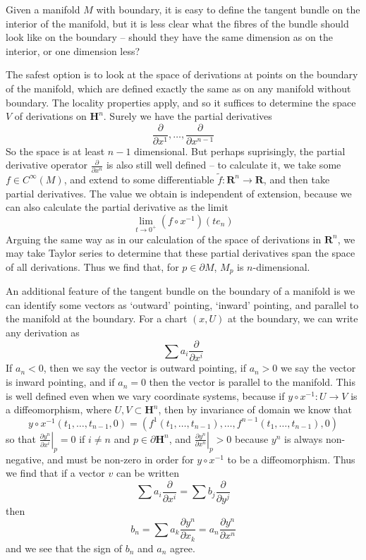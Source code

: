 Given a manifold $M$ with boundary, it is easy to define the tangent bundle on the interior of the manifold, but it is less clear what the fibres of the bundle should look like on the boundary -- should they have the same dimension as on the interior, or one dimension less?

The safest option is to look at the space of derivations at points on the boundary of the manifold, which are defined exactly the same as on any manifold without boundary. The locality properties apply, and so it suffices to determine the space $V$ of derivations on $\mathbf{H}^n$. Surely we have the partial derivatives
%
\[ \frac{\partial}{\partial x^1}, \dots, \frac{\partial}{\partial x^{n-1}} \]
%
So the space is at least $n-1$ dimensional. But perhaps suprisingly, the partial derivative operator $\frac{\partial}{\partial x^n}$ is also still well defined -- to calculate it, we take some $f \in C^\infty(M)$, and extend to some differentiable $\tilde{f}: \mathbf{R}^n \to \mathbf{R}$, and then take partial derivatives. The value we obtain is independent of extension, because we can also calculate the partial derivative as the limit
%
\[ \lim_{t \to 0^+} (f \circ x^{-1})(te_n) \]
%
Arguing the same way as in our calculation of the space of derivations in $\mathbf{R}^n$, we may take Taylor series to determine that these partial derivatives span the space of all derivations. Thus we find that, for $p \in \partial M$, $M_p$ is $n$-dimensional.

An additional feature of the tangent bundle on the boundary of a manifold is we can identify some vectors as `outward' pointing, `inward' pointing, and parallel to the manifold at the boundary. For a chart $(x,U)$ at the boundary, we can write any derivation as
%
\[ \sum a_i \frac{\partial}{\partial x^i} \]
%
If $a_n < 0$, then we say the vector is outward pointing, if $a_n > 0$ we say the vector is inward pointing, and if $a_n = 0$ then the vector is parallel to the manifold. This is well defined even when we vary coordinate systems, because if $y \circ x^{-1}: U \to V$ is a diffeomorphism, where $U,V \subset \mathbf{H}^n$, then by invariance of domain we know that
%
\[ y \circ x^{-1}(t_1, \dots, t_{n-1}, 0) = (f^1(t_1, \dots, t_{n-1}), \dots, f^{n-1}(t_1, \dots, t_{n-1}), 0) \]
%
so that $\left.\frac{\partial y^n}{\partial x^i}\right|_p = 0$ if $i \neq n$ and $p \in \partial \mathbf{H}^n$, and $\left. \frac{\partial y^n}{\partial x^n}\right|_p > 0$ because $y^n$ is always non-negative, and must be non-zero in order for $y \circ x^{-1}$ to be a diffeomorphism. Thus we find that if a vector $v$ can be written
%
\[ \sum a_i \frac{\partial}{\partial x^i} = \sum b_j \frac{\partial}{\partial y^j} \]
%
then
%
\[ b_n = \sum a_k \frac{\partial y^n}{\partial x_k} = a_n \frac{\partial y^n}{\partial x^n} \]
%
and we see that the sign of $b_n$ and $a_n$ agree.

